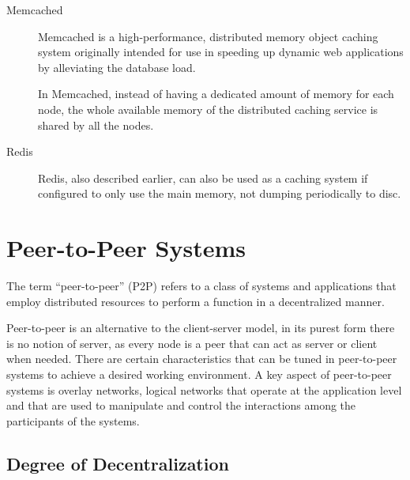 	\begin{description}
	\item[Memcached]\cite{site_memcached} Memcached is a high-performance, distributed memory object caching system originally intended for use in speeding up dynamic web applications by alleviating the database load.\par
	In Memcached, instead of having a dedicated amount of memory for each node, the whole available memory of the distributed caching service is shared by all the nodes.
	
\item[Redis] Redis, also described earlier, can also be used as a caching system if configured to only use the main memory, not dumping periodically to disc.
	\end{description}

\section{Peer-to-Peer Systems}
\label{sec:peer_to_peer_systems}
The term “peer-to-peer” (P2P) refers to a class of systems and applications that employ distributed resources to perform a function
in a decentralized manner\cite{p2p_computing}.\par
	Peer-to-peer is an alternative to the client-server model, in its purest form there is no notion of server, as every node is a peer that can act as server or client when needed. There are certain characteristics that can be tuned in peer-to-peer systems to achieve a desired working environment. A key aspect of peer-to-peer systems is overlay networks, logical networks that operate at the application level and that are used to manipulate and control the interactions among the participants of the systems.
	
\subsection{Degree of Decentralization}
\label{sec:degree_of_decentralization}

